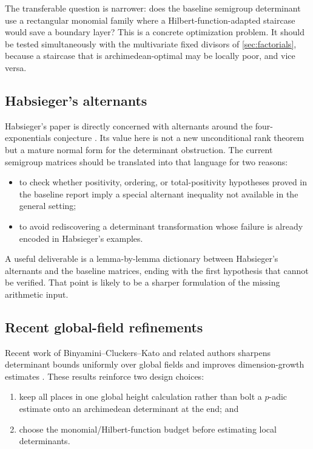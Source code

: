 \documentclass[10pt,letterpaper]{article}
\begin{document}
The transferable question is narrower: does the baseline semigroup determinant use a
rectangular monomial family where a Hilbert-function-adapted staircase would save a boundary
layer?  This is a concrete optimization problem.  It should be tested simultaneously with
the multivariate fixed divisors of \cref{sec:factorials}, because a staircase that is
archimedean-optimal may be locally poor, and vice versa.

\subsection{Habsieger's alternants}

Habsieger's paper is directly concerned with alternants around the four-exponentials
conjecture \cite{Habsieger2007}.  Its value here is not a new unconditional rank theorem but
a mature normal form for the determinant obstruction.  The current semigroup matrices should
be translated into that language for two reasons:

\begin{itemize}
\item to check whether positivity, ordering, or total-positivity hypotheses proved in the
baseline report imply a special alternant inequality not available in the general setting;
\item to avoid rediscovering a determinant transformation whose failure is already encoded
in Habsieger's examples.
\end{itemize}

A useful deliverable is a lemma-by-lemma dictionary between Habsieger's alternants and the
baseline matrices, ending with the first hypothesis that cannot be verified.  That point is
likely to be a sharper formulation of the missing arithmetic input.

\subsection{Recent global-field refinements}

Recent work of Binyamini--Cluckers--Kato and related authors sharpens determinant bounds
uniformly over global fields and improves dimension-growth estimates
\cite{BinyaminiCluckersKato}.  These results reinforce two design choices:

\begin{enumerate}
\item keep all places in one global height calculation rather than bolt a \(p\)-adic estimate
onto an archimedean determinant at the end; and
\item choose the monomial/Hilbert-function budget before estimating local determinants.
\end{enumerate}
\end{document}

